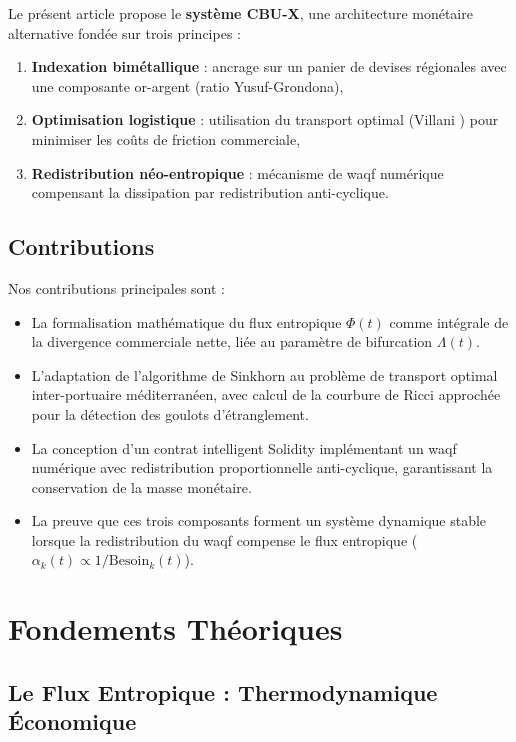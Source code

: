 \documentclass[11pt,a4paper]{article}
\theoremstyle{definition}
\theoremstyle{remark}
\begin{document}
Le présent article propose le \textbf{système CBU-X}, une architecture monétaire alternative fondée sur trois principes :
\begin{enumerate}
    \item \textbf{Indexation bimétallique} : ancrage sur un panier de devises régionales avec une composante or-argent (ratio Yusuf-Grondona),
    \item \textbf{Optimisation logistique} : utilisation du transport optimal (Villani \cite{villani2009}) pour minimiser les coûts de friction commerciale,
    \item \textbf{Redistribution néo-entropique} : mécanisme de waqf numérique compensant la dissipation par redistribution anti-cyclique.
\end{enumerate}

\subsection{Contributions}

Nos contributions principales sont :
\begin{itemize}
    \item La formalisation mathématique du flux entropique $\Phi(t)$ comme intégrale de la divergence commerciale nette, liée au paramètre de bifurcation $\Lambda(t)$.
    \item L'adaptation de l'algorithme de Sinkhorn \cite{cuturi2013} au problème de transport optimal inter-portuaire méditerranéen, avec calcul de la courbure de Ricci approchée pour la détection des goulots d'étranglement.
    \item La conception d'un contrat intelligent Solidity implémentant un waqf numérique avec redistribution proportionnelle anti-cyclique, garantissant la conservation de la masse monétaire.
    \item La preuve que ces trois composants forment un système dynamique stable lorsque la redistribution du waqf compense le flux entropique ($\alpha_k(t) \propto 1/\text{Besoin}_k(t)$).
\end{itemize}

\section{Fondements Théoriques}
\label{sec:fondements}

\subsection{Le Flux Entropique : Thermodynamique Économique}
\end{document}
